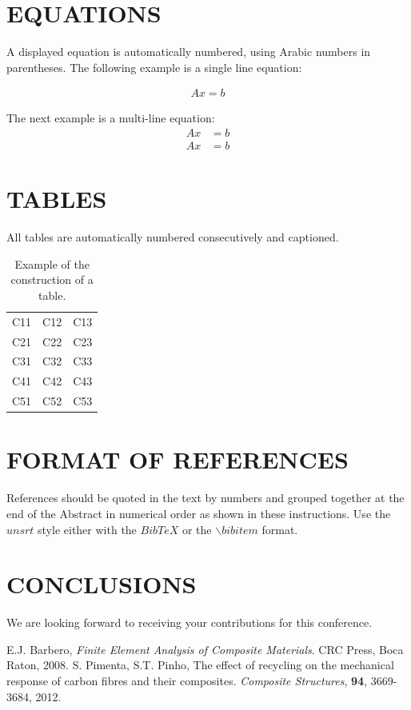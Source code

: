 \documentclass[12pt,a4paper]{article}
\begin{document}
\section{EQUATIONS}

A displayed equation is automatically numbered, using Arabic numbers in parentheses.
The following example is a single line equation:

\begin{align}
 Ax = b
\end{align}

The next example is a multi-line equation:
\begin{equation}
 \begin{aligned}
  Ax &=b \\
  Ax &=b
 \end{aligned}
\end{equation}


\section{TABLES}
All tables are automatically numbered consecutively and captioned.

\begin{table}[!h]
\centering
\caption{Example of the construction of a table.}
\setlength{\arrayrulewidth}{2\arrayrulewidth}
\begin{tabular}{ccc}
\hline
C11 & C12 & C13 \\
C21 & C22 & C23 \\
C31 & C32 & C33 \\
C41 & C42 & C43 \\
C51 & C52 & C53 \\
\hline
\end{tabular}
\end{table}


\section{FORMAT OF REFERENCES}
References should be quoted in the text by numbers \cite{Barbero,Pimenta} and grouped together at the end of the Abstract in numerical order as shown in these instructions. Use the $unsrt$ style either with the $BibTeX$ or the $\backslash$$bibitem$ format.

\section{CONCLUSIONS}

We are looking forward to receiving your contributions for this conference.


\begin{thebibliography}{10}

 E.J. Barbero, \textit{Finite Element Analysis of Composite Materials}. CRC Press, Boca Raton, 2008.
 S. Pimenta, S.T. Pinho, The effect of recycling on the mechanical response of carbon fibres and their composites. \textit{Composite Structures}, \textbf{94}, 3669-3684, 2012.

\end{thebibliography}
\end{document}
